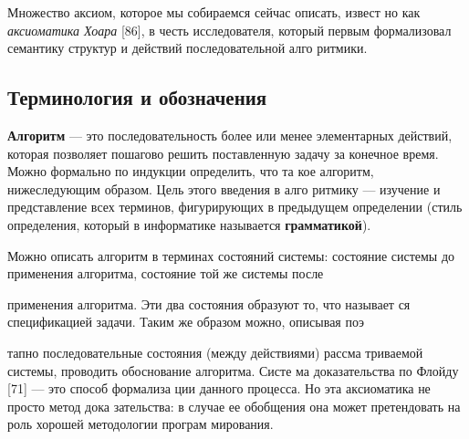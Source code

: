	\parindent=1cm Множество аксиом, которое мы собираемся сейчас описать, извест­
	но как \textit{аксиоматика Хоара} [86], в честь исследователя, который первым
	формализовал семантику структур и действий последовательной алго
	ритмики.
	
	\subsection{Терминология и обозначения}
	
	\noindent \textbf{Алгоритм} — это последовательность более или менее элементарных
	действий, которая позволяет пошагово решить поставленную задачу за
	конечное время. Можно формально по индукции определить, что та­
	кое алгоритм, нижеследующим образом. Цель этого введения в алго­
	ритмику — изучение и представление всех терминов, фигурирующих в
	предыдущем определении (стиль определения, который в информатике
	называется \textbf{грамматикой}).
	
	\parindent=1cm Можно описать алгоритм в терминах состояний системы: состояние
	системы до применения алгоритма, состояние той же системы после
	\pagebreak
	
\noindent применения алгоритма. Эти два состояния образуют то, что называет­
ся спецификацией задачи. Таким же образом можно, описывая поэ­
тапно последовательные состоя­ния\linebreak
(между действиями) рассма­
триваемой системы, проводить обоснование алгоритма. Систе­
ма доказательства по Флой­ду [71] — это способ формализа­
ции данного процесса. Но эта ак­сиоматика не просто метод дока­
зательства: в случае ее обобще­ния она может претендовать на роль хорошей методологии програм
мирования.
\newline

